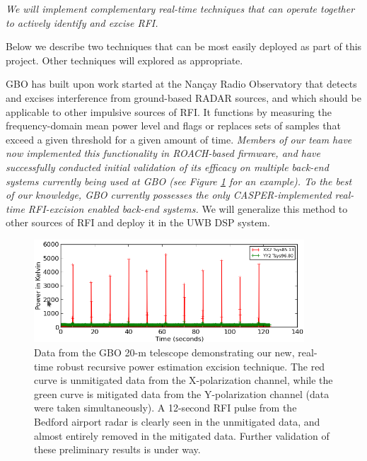 \documentclass[10pt]{myNSF}
\begin{document}
\label{sec:rfi_excision}

\emph{We will implement complementary real-time techniques that can
  operate together to actively identify and excise RFI.}

Below we describe two techniques that can be most easily deployed as
part of this project.  Other techniques will explored as appropriate.

 GBO has built upon
work started at the Nan\c{c}ay Radio Observatory \citep{dwr17} that
detects and excises interference from ground-based RADAR sources, and
which should be applicable to other impulsive sources of RFI.  It
functions by measuring the frequency-domain mean power level and flags
or replaces sets of samples that exceed a given threshold for a given
amount of time.  \emph{Members of our team have now implemented this
  functionality in ROACH-based firmware, and have successfully
  conducted initial validation of its efficacy on multiple back-end
  systems currently being used at GBO (see Figure \ref{fig:rfi} for an
  example).  To the best of our knowledge, GBO currently possesses the
  only CASPER-implemented real-time RFI-excision enabled back-end
  systems.}  We will generalize this method to other sources of RFI
and deploy it in the UWB DSP system.

\begin{figure}
  \centering
  \includegraphics[width=0.9\textwidth]{rfi_excision.png}
  \caption{Data from the GBO 20-m telescope demonstrating our new,
    real-time robust recursive power estimation excision technique.
    The red curve is unmitigated data from the X-polarization channel,
    while the green curve is mitigated data from the Y-polarization
    channel (data were taken simultaneously).  A 12-second RFI pulse
    from the Bedford airport radar is clearly seen in the unmitigated
    data, and almost entirely removed in the mitigated data.  Further
    validation of these preliminary results is under
    way.  \label{fig:rfi}}
\end{figure}
\end{document}
